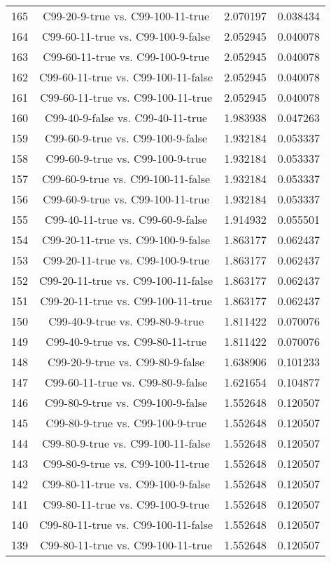 \documentclass[a4paper,10pt]{article}
\begin{document}
\begin{landscape}
\begin{table}[!htp]
\begin{tabular}{cccc}
165&C99-20-9-true vs. C99-100-11-true&2.070197&0.038434\\
164&C99-60-11-true vs. C99-100-9-false&2.052945&0.040078\\
163&C99-60-11-true vs. C99-100-9-true&2.052945&0.040078\\
162&C99-60-11-true vs. C99-100-11-false&2.052945&0.040078\\
161&C99-60-11-true vs. C99-100-11-true&2.052945&0.040078\\
160&C99-40-9-false vs. C99-40-11-true&1.983938&0.047263\\
159&C99-60-9-true vs. C99-100-9-false&1.932184&0.053337\\
158&C99-60-9-true vs. C99-100-9-true&1.932184&0.053337\\
157&C99-60-9-true vs. C99-100-11-false&1.932184&0.053337\\
156&C99-60-9-true vs. C99-100-11-true&1.932184&0.053337\\
155&C99-40-11-true vs. C99-60-9-false&1.914932&0.055501\\
154&C99-20-11-true vs. C99-100-9-false&1.863177&0.062437\\
153&C99-20-11-true vs. C99-100-9-true&1.863177&0.062437\\
152&C99-20-11-true vs. C99-100-11-false&1.863177&0.062437\\
151&C99-20-11-true vs. C99-100-11-true&1.863177&0.062437\\
150&C99-40-9-true vs. C99-80-9-true&1.811422&0.070076\\
149&C99-40-9-true vs. C99-80-11-true&1.811422&0.070076\\
148&C99-20-9-true vs. C99-80-9-false&1.638906&0.101233\\
147&C99-60-11-true vs. C99-80-9-false&1.621654&0.104877\\
146&C99-80-9-true vs. C99-100-9-false&1.552648&0.120507\\
145&C99-80-9-true vs. C99-100-9-true&1.552648&0.120507\\
144&C99-80-9-true vs. C99-100-11-false&1.552648&0.120507\\
143&C99-80-9-true vs. C99-100-11-true&1.552648&0.120507\\
142&C99-80-11-true vs. C99-100-9-false&1.552648&0.120507\\
141&C99-80-11-true vs. C99-100-9-true&1.552648&0.120507\\
140&C99-80-11-true vs. C99-100-11-false&1.552648&0.120507\\
139&C99-80-11-true vs. C99-100-11-true&1.552648&0.120507\\

\end{tabular}
\end{table}
\end{landscape}
\end{document}
